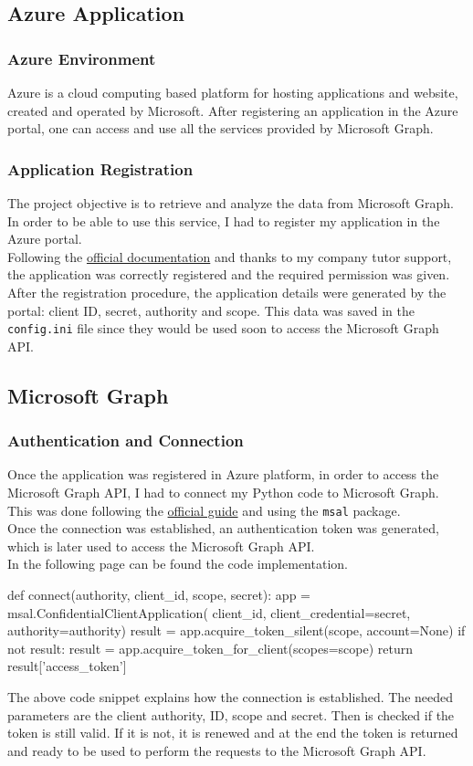 \documentclass[12pt, a4paper, oneside]{article}
\begin{document}
\subsection{Azure Application}
\subsubsection{Azure Environment}
Azure is a cloud computing based platform for hosting applications and website, created and operated by Microsoft. After registering an application in the Azure portal, one can access and use all the services
provided by Microsoft Graph.
\subsubsection{Application Registration}
The project objective is to retrieve and analyze the data from Microsoft Graph. In order to be able to use this service, I had to register my application in the Azure portal.\\
Following the \href{https://docs.microsoft.com/en-us/graph/auth-v2-service#authentication-and-authorization-steps}{official documentation} and thanks to my company tutor support, the application was correctly
registered and the required permission was given. After the registration procedure, the application details were generated by the portal: client ID, secret, authority and scope. This data was saved in the 
\texttt{config.ini} file since they would be used soon to access the Microsoft Graph API.

\subsection{Microsoft Graph}
\subsubsection{Authentication and Connection}
Once the application was registered in Azure platform, in order to access the Microsoft Graph API, I had to connect my Python code to Microsoft Graph. This was done following the 
\href{https://github.com/Azure-Samples/ms-identity-python-daemon/tree/master/1-Call-MsGraph-WithSecret}{official guide} and using the \texttt{msal} package.\\
Once the connection was established, an authentication token was generated, which is later used to access the Microsoft Graph API.\\
In the following page can be found the code implementation.
\newpage
\begin{python}
  def connect(authority, client_id, scope, secret):
      app = msal.ConfidentialClientApplication(
            client_id, client_credential=secret, 
            authority=authority)
      result = app.acquire_token_silent(scope, account=None)
      if not result:
          result = app.acquire_token_for_client(scopes=scope)
      return result['access_token']
\end{python}
The above code snippet explains how the connection is established. The needed parameters are the client authority, ID, scope and secret. Then is checked if the token is still valid. If it is not, it is renewed
and at the end the token is returned and ready to be used to perform the requests to the Microsoft Graph API.
\end{document}
